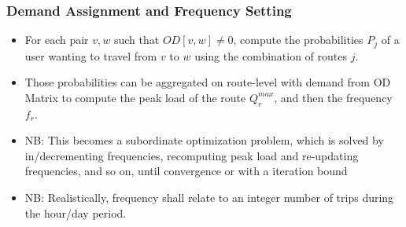 \documentclass[dvipsnames]{beamer}
\begin{document}
\begin{frame}
  \frametitle{Demand Assignment and Frequency Setting}

  \begin{itemize}
    \item For each pair $v, w$ such that $OD[v, w] \neq 0$, compute the probabilities $P_{j}$ of a user wanting to travel from $v$ to $w$ using the combination of routes $j$.
    \item Those probabilities can be aggregated on route-level with demand from OD Matrix to compute the peak load of the route $Q^{max}_{r}$, and then the frequency $f_r$.
    \item NB: This becomes a subordinate optimization problem, which is solved by in/decrementing frequencies, recomputing peak load and re-updating frequencies, and so on, until convergence or with a iteration bound
    \item NB: Realistically, frequency shall relate to an integer number of trips during the hour/day period.
  \end{itemize}
\end{frame}
\end{document}
